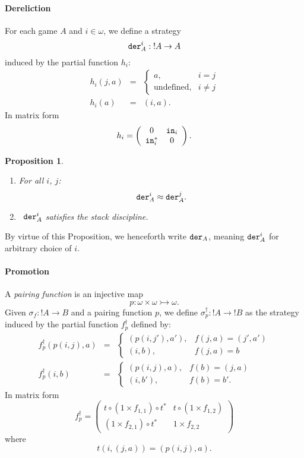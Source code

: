 \documentclass[11pt]{article}
\newtheorem{proposition}[theorem]{Proposition}
\newcommand{\Mat}[4]{\left( \begin{array}{cc}
#1 & #2 \\
#3 & #4
\end{array} \right)}
\newcommand{\Deq}{\approx}
\newcommand{\ofcourse}{\mbox{$!$}}
\begin{document}
\paragraph{Dereliction}
For each game $A$ and $i \in \omega$, we define a strategy
\[ {\tt der}_{A}^{i} : \ofcourse A \rightarrow A \]
induced by the partial function $h_{i}$:
\[ \begin{array}{lcl}
h_{i}(j, a) & = & \left\{ \begin{array}{ll}
a, & i=j \\
\mbox{undefined}, & i \neq j
\end{array} \right. \\
h_{i}(a) & = & (i, a) .
\end{array} \]
In matrix form
\[ h_{i} =  \Mat{0}{{\tt in}_{i}}{{\tt in}_{i}^{\ast}}{0} . \]

\begin{proposition}
\begin{enumerate}
\item For all $i$, $j$:
\[ {\tt der}_{A}^{i} \Deq {\tt der}_{A}^{j}. \]
\item \, ${\tt der}_{A}^{i}$ satisfies the stack discipline.
\end{enumerate}
\end{proposition}

By virtue of this Proposition, we henceforth write ${\tt der}_{A}$, meaning
${\tt der}_{A}^{i}$ for arbitrary choice of $i$.

\paragraph{Promotion}
A {\em pairing function} is an injective map
\[ p : \omega \times \omega \rightarrowtail \omega . \]
Given $\sigma_{f} : \ofcourse A \rightarrow B$ and a pairing function $p$, we define
$\sigma^{\dagger}_{p} : \ofcourse A \rightarrow \ofcourse B$ as the strategy induced by the
partial function $f^{\dagger}_{p}$ defined by:
\[ \begin{array}{lcl}
f_{p}^{\dagger}(p(i,j),a) & = & \left\{
\begin{array}{ll}
(p(i,j'), a'), & f(j,a) = (j',a') \\
(i,b), & f(j,a) = b
\end{array} \right.
\\
f_{p}^{\dagger}(i,b) & = & \left\{
\begin{array}{ll}
(p(i,j),a), & f(b) = (j,a) \\
(i,b'), & f(b) = b' .
\end{array} \right.
\end{array} \]
In matrix form
\[ f^{\dagger}_{p} = \Mat{t \circ (1 \times f_{1,1}) \circ t^{\ast}}{t \circ
(1 \times f_{1,2})}{(1 \times f_{2,1}) \circ t^{\ast}}{1 \times f_{2,2}}
\]
where
\[ t(i, (j, a)) = (p(i,j), a) . \]
\end{document}
